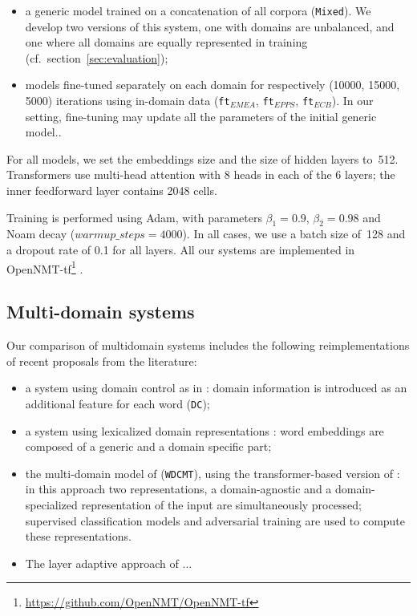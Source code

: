 \documentclass[11pt]{article}
\newcommand{\fyTodo}[1]{\Todo[FY:]{\textcolor{orange}{#1}}}
\begin{document}
\begin{itemize}
\item a generic model trained on a concatenation of all corpora (\texttt{Mixed}). We develop two versions of this system, one with domains are unbalanced, and one where all domains are equally represented in training (cf.\ section~\ref{sec:evaluation});
\item models fine-tuned \cite{Freitag16fast} separately on each domain for respectively (10000, 15000, 5000)\fyTodo{fix this} iterations using in-domain data (\texttt{ft$_{EMEA}$}, \texttt{ft$_{EPPS}$}, \texttt{ft$_{ECB}$}). In our setting, fine-tuning may update all the parameters of the initial generic model.\fyTodo{Check This}.
\end{itemize}

For all models, we set the embeddings size and the size of hidden layers to~512. Transformers use multi-head attention with 8 heads in each of the 6 layers; the inner feedforward layer contains 2048 cells.

Training is performed using Adam, with parameters $\beta_1=0.9$, $\beta_2= 0.98$ and Noam decay ($warmup\_steps=4000$). In all cases, we use a batch size of~128 and a dropout rate of 0.1 for all layers.  All our systems are implemented in OpenNMT-tf\footnote{\url{https://github.com/OpenNMT/OpenNMT-tf}} \cite{Klein17opennmt}.

\subsection{Multi-domain systems \label{ssec:systems}}
Our comparison of multidomain systems includes the following reimplementations of recent proposals from the literature:
\begin{itemize}
\item a system using domain control as in \cite{Kobus17domaincontrol}: domain information is introduced as an additional feature for each word \fyTodo{Check this} (\texttt{DC});
\item a system using lexicalized domain representations \cite{Pham19generic}: word embeddings are composed of a generic and a domain specific part;
\item the multi-domain model of \cite{Zeng18multidomain} (\texttt{WDCMT}), using the transformer-based version of \cite{Su19exploring}: in this approach two representations, a domain-agnostic and a domain-specialized representation of the input are simultaneously processed; supervised classification models and adversarial training are used to compute these representations.
\item The layer adaptive approach of \cite{Jiang19multidomain} ...
\end{itemize}
\end{document}

